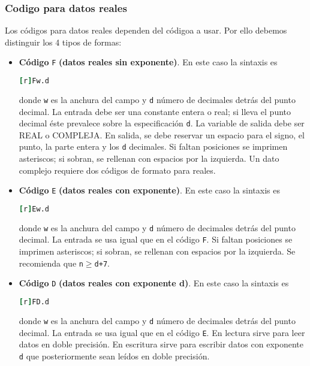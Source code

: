 \subsubsection{Codigo para datos reales}

Los códigos para datos reales dependen del códigoa a usar. Por ello debemos distinguir los 4 tipos de formas:

\begin{itemize}
	\item \textbf{Código} \texttt{F} \textbf{(datos reales sin exponente)}. En este caso la sintaxis es
	 
	\begin{lstlisting}[language=Fortran]
		[r]Fw.d
	\end{lstlisting}

	donde {\tt w} es la anchura del campo y {\tt d} número de decimales detrás del punto decimal. La entrada debe ser una constante entera o real; si lleva el punto decimal éste prevalece sobre la especificación {\tt d}. La variable de salida debe ser REAL o COMPLEJA. En salida, se debe reservar un espacio para el signo, el punto, la parte entera y los {\tt d} decimales. Si faltan posiciones se imprimen asteriscos; si sobran, se rellenan con espacios por la izquierda. Un dato complejo requiere dos códigos de formato para reales.

	\item \textbf{Código} \texttt{E} \textbf{(datos reales con exponente)}. En este caso la sintaxis es

	\begin{lstlisting}[language=Fortran]
		[r]Ew.d
	\end{lstlisting}

	donde {\tt w} es la anchura del campo y {\tt d} número de decimales detrás del punto decimal. La entrada se usa igual que en el código {\tt F}. Si faltan posiciones se imprimen asteriscos; si sobran, se rellenan con espacios por la izquierda. Se recomienda que {\tt n}$\geq${\tt d+7}.
	
	\item \textbf{Código} \texttt{D} \textbf{(datos reales con exponente d)}. En este caso la sintaxis es
	 
	\begin{lstlisting}[language=Fortran]
		[r]FD.d
	\end{lstlisting}

	donde {\tt w} es la anchura del campo y {\tt d} número de decimales detrás del punto decimal. La entrada se usa igual que en el código {\tt E}. En lectura sirve para leer datos en doble precisión. En escritura sirve para escribir datos con exponente {\tt d} que posteriormente sean leídos en doble precisión.


\end{itemize}
